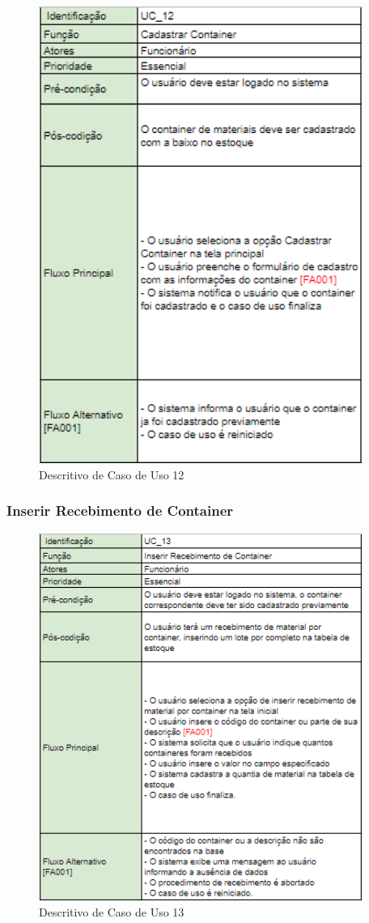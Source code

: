 \documentclass[rascunho,xindy,acronym,symbols]{fei}
\begin{document}
\begin{figure}[H]
    \centering
    \includegraphics[scale=0.6, width=300pt]{./Images/Descritivos/UC12.png}
    \caption{Descritivo de Caso de Uso 12}
     \label{fig:desc_uc12}
\end{figure}

\subsubsection{Inserir Recebimento de Container}

\begin{figure}[H]
    \centering
    \includegraphics[scale=0.6, width=300pt]{./Images/Descritivos/UC13.png}
    \caption{Descritivo de Caso de Uso 13}
     \label{fig:desc_uc13}
\end{figure}
\end{document}
